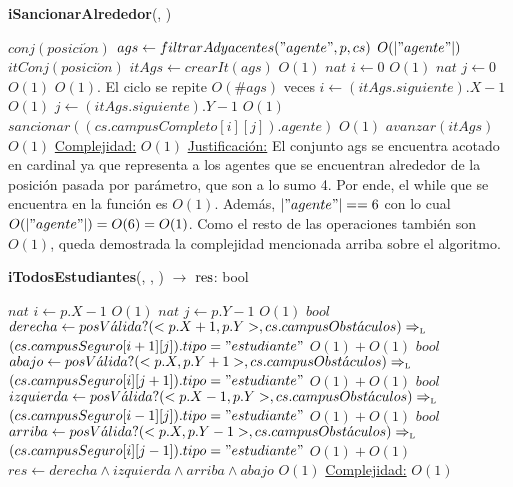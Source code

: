 \begin{Algoritmos}
\begin{algorithm}[H]{\textbf{iSancionarAlrededor}(, )}
	\begin{algorithmic}
		\State $conj(posici\acute{o}n)$ $ags \gets filtrarAdyacentes("agente",p,cs)$	\Comment $O(|"agente"|)$
		\State $itConj(posici\acute{o}n)$ $itAgs \gets crearIt(ags)$	\Comment $O(1)$
        \State $nat$ $i \gets 0$	\Comment $O(1)$
        \State $nat$ $j \gets 0$	\Comment $O(1)$
			\Comment  $O(1)$. El ciclo se repite $O(\#ags)$ veces
			\State $i \gets (itAgs.siguiente).X-1$	\Comment $O(1)$
		    \State $j \gets (itAgs.siguiente).Y-1$ 	\Comment $O(1)$
		    \State $sancionar((cs.campusCompleto[i][j]).agente)$	\Comment $O(1)$
		    \State $avanzar(itAgs)$	\Comment $O(1)$
		\EndWhile
        \medskip
		\Statex \underline{Complejidad:} $O(1)$
        \Statex \underline{Justificaci\'on:} El conjunto ags se encuentra acotado en cardinal ya que representa a los agentes que se encuentran alrededor de la posici\'on pasada por par\'ametro, que son a lo sumo 4. Por ende, el while que se encuentra en la funci\'on es $O(1)$. Adem\'as, $|"agente"| == 6$ con lo cual $O(|"agente"|) = O(6) = O(1)$. Como el resto de las operaciones tambi\'en son $O(1)$, queda demostrada la complejidad mencionada arriba sobre el algoritmo.
	\end{algorithmic}
\end{algorithm}


\begin{algorithm}[H]{\textbf{iTodosEstudiantes}(, , ) $\to$ $\res$: bool}
	\begin{algorithmic}
    	\State $nat$ $i \gets p.X-1$	\Comment $O(1)$
    	\State $nat$ $j \gets p.Y-1$	\Comment $O(1)$
        \State $bool$ $derecha \gets posV\acute{a}lida?(<p.X+1,p.Y>,cs.campusObst\acute{a}culos) \Rightarrow_{\mathrm{\scriptscriptstyle{L}}}$ \\ \hspace{65pt} $(cs.campusSeguro[i+1][j]).tipo = "estudiante"$	\Comment $O(1) + O(1)$
        \State $bool$ $abajo \gets posV\acute{a}lida?(<p.X,p.Y+1>,cs.campusObst\acute{a}culos) \Rightarrow_{\mathrm{\scriptscriptstyle{L}}}$ \\ \hspace{65pt} $(cs.campusSeguro[i][j+1]).tipo = "estudiante"$	\Comment $O(1) + O(1)$
        \State $bool$ $izquierda \gets posV\acute{a}lida?(<p.X-1,p.Y>,cs.campusObst\acute{a}culos) \Rightarrow_{\mathrm{\scriptscriptstyle{L}}}$ \\ \hspace{65pt} $(cs.campusSeguro[i-1][j]).tipo = "estudiante"$	\Comment $O(1) + O(1)$
        \State $bool$ $arriba \gets posV\acute{a}lida?(<p.X,p.Y-1>,cs.campusObst\acute{a}culos) \Rightarrow_{\mathrm{\scriptscriptstyle{L}}}$ \\ \hspace{65pt} $(cs.campusSeguro[i][j-1]).tipo = "estudiante"$	\Comment $O(1) + O(1)$
        \State $res \gets derecha \land izquierda \land arriba \land abajo$	\Comment $O(1)$
        \medskip
		\Statex \underline{Complejidad:} $O(1)$
	\end{algorithmic}
\end{algorithm}


\end{Algoritmos}
